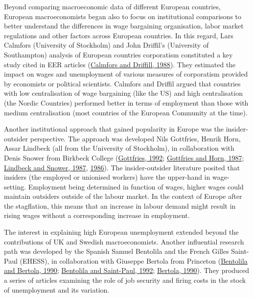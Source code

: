 \documentclass[
  12pt,
  onecolumn]{article}
\begin{document}
Beyond comparing macroeconomic data of different European countries,
European macroeconomists began also to focus on institutional
comparisons to better understand the differences in wage bargaining
organisation, labor market regulations and other factors across European
countries. In this regard, Lars Calmfors (University of Stockholm) and
John Driffil's (University of Southampton) analysis of European
countries corporatism constituted a key study cited in EER articles
(\protect\hyperlink{ref-calmfors1988}{Calmfors and Driffill, 1988}).
They estimated the impact on wages and unemployment of various measures
of corporatism provided by economists or political scientists. Calmfors
and Driffil argued that countries with low centralisation of wage
bargaining (like the US) and high centralisation (the Nordic Countries)
performed better in terms of employment than those with medium
centralisation (most countries of the European Community at the time).

Another institutional approach that gained popularity in Europe was the
insider-outsider perspective. The approach was developed Nils Gottfries,
Henrik Horn, Assar Lindbeck (all from the University of Stockholm), in
collaboration with Denis Snower from Birkbeck College
(\protect\hyperlink{ref-gottfries1992}{Gottfries, 1992};
\protect\hyperlink{ref-gottfries1987}{Gottfries and Horn, 1987};
\protect\hyperlink{ref-lindbeck1987a}{Lindbeck and Snower, 1987},
\protect\hyperlink{ref-lindbeck1986}{1986}). The insider-outsider
literature posited that insiders (the employed or unionised workers)
have the upper-hand in wage-setting. Employment being determined in
function of wages, higher wages could maintain outsiders outside of the
labour market. In the context of Europe after the stagflation, this
means that an increase in labour demand might result in rising wages
without a corresponding increase in employment.

The interest in explaining high European unemployment extended beyond
the contributions of UK and Swedish macroeconomists. Another influential
research path was developed by the Spanish Samuel Bentolila and the
French Gilles Saint-Paul (EHESS), in collaboration with Giuseppe Bertola
from Princeton (\protect\hyperlink{ref-bentolila1990}{Bentolila and
Bertola, 1990}; \protect\hyperlink{ref-bentolila1992a}{Bentolila and
Saint-Paul, 1992}; \protect\hyperlink{ref-bertola1990a}{Bertola, 1990}).
They produced a series of articles examining the role of job security
and firing costs in the stock of unemployment and its variation.
\end{document}

